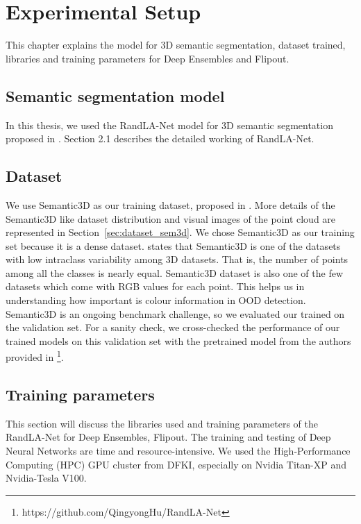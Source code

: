 

    \chapter{Experimental Setup}
    This chapter explains the model for 3D semantic segmentation, dataset trained, libraries and training parameters for Deep Ensembles and Flipout.

    \section{Semantic segmentation model}
    In this thesis, we used the RandLA-Net model for 3D semantic segmentation proposed in \cite{Hu_2020_CVPR_Randla}.
    Section 2.1 describes the detailed working of RandLA-Net. 

    \section{Dataset}
    We use Semantic3D as our training dataset, proposed in \cite{hackel2017semantic3d}.
    More details of the Semantic3D like dataset distribution and visual images of the point cloud are represented in Section~\ref{sec:dataset_sem3d}.
    We chose Semantic3D as our training set because it is a dense dataset.
    \cite{survey3d} states that Semantic3D is one of the datasets with low intraclass variability among 3D datasets.
    That is, the number of points among all the classes is nearly equal.
    Semantic3D dataset is also one of the few datasets which come with RGB values for each point.
    This helps us in understanding how important is colour information in OOD detection.
    Semantic3D is an ongoing benchmark challenge, so we evaluated our trained on the validation set.
    For a sanity check, we cross-checked the performance of our trained models on this validation set with the pretrained model from the authors provided in \footnote[1]{https://github.com/QingyongHu/RandLA-Net}.

    \section{Training parameters}
    This section will discuss the libraries used and training parameters of the RandLA-Net for Deep Ensembles, Flipout.
    The training and testing of Deep Neural Networks are time and resource-intensive.
    We used the High-Performance Computing (HPC) GPU cluster from DFKI, especially on Nvidia Titan-XP and Nvidia-Tesla V100.

